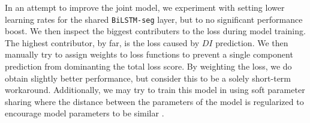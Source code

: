 In an attempt to improve the joint model, we experiment with setting lower
learning rates for the shared \texttt{BiLSTM-seg} layer, but to no significant
performance boost.  We then inspect the biggest contributers to the loss during
model training.  The highest contributor, by far, is the loss caused by $DI$
prediction.  We then manually try to assign weights to loss functions to
prevent a single component prediction from dominanting the total loss score.
By weighting the loss, we do obtain slightly better performance, but consider
this to be a solely short-term workaround. 
Additionally, we may try to train this model in using soft parameter sharing
where the distance between the parameters of the
model is regularized to encourage model parameters to be similar
\citep{ruder2017overview}.


